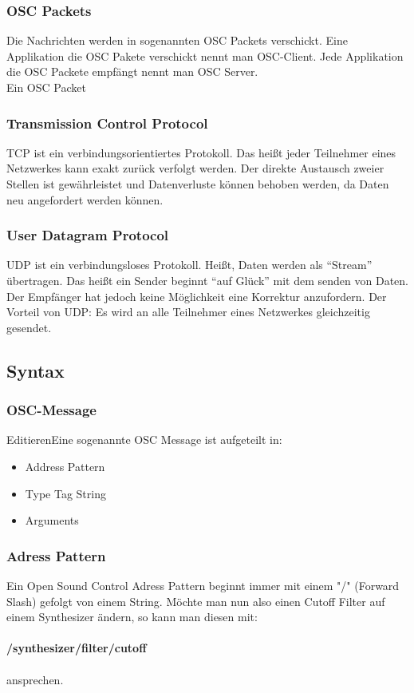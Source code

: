 \documentclass[a4paper, 12pt]{article}
\begin{document}
\subsubsection{OSC Packets}
Die Nachrichten werden in sogenannten OSC Packets verschickt. Eine Applikation die OSC Pakete verschickt nennt man OSC-Client. Jede Applikation die OSC Packete empfängt nennt man OSC Server.
\\
Ein OSC Packet
\subsubsection{Transmission Control Protocol}
TCP ist ein verbindungsorientiertes Protokoll. Das heißt jeder Teilnehmer eines Netzwerkes kann exakt zurück verfolgt werden. Der direkte Austausch zweier Stellen ist gewährleistet und Datenverluste können behoben werden, da Daten neu angefordert werden können.

\subsubsection{User Datagram Protocol}
UDP ist ein verbindungsloses Protokoll. Heißt, Daten werden als “Stream” übertragen. Das heißt ein Sender beginnt “auf Glück” mit dem senden von Daten. Der Empfänger hat jedoch keine Möglichkeit eine Korrektur anzufordern. Der Vorteil von UDP: Es wird an alle Teilnehmer eines Netzwerkes gleichzeitig gesendet.
\subsection{Syntax}
\subsubsection{OSC-Message}
EditierenEine sogenannte OSC Message ist aufgeteilt in:
\begin{itemize}
  \item Address Pattern
  \item Type Tag String
  \item Arguments
\end{itemize}
\subsubsection{Adress Pattern}
Ein Open Sound Control Adress Pattern beginnt immer mit einem "/" (Forward Slash) gefolgt von einem String. Möchte man nun also einen Cutoff Filter auf einem Synthesizer ändern, so kann man diesen mit:\\
\\
{\bf /synthesizer/filter/cutoff } \\
\\
ansprechen.
\end{document}
